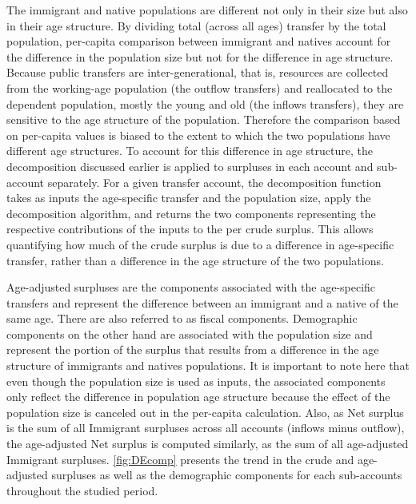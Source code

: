 The immigrant and native populations are different not only in their size but also in their age structure.
By dividing total (across all ages) transfer by the total population, per-capita comparison between immigrant and natives account for the difference in the population size but not for the difference in age structure.
Because public transfers are inter-generational, that is, resources are collected from the working-age population (the outflow transfers) and reallocated to the dependent population, mostly the young and old (the inflows transfers), they are sensitive to the age structure of the population.
Therefore the comparison based on per-capita values is biased to the extent to which the two populations have different age structures.
To account for this difference in age structure, the decomposition discussed earlier is applied to surpluses in each account and sub-account separately.
For a given transfer account, the decomposition function takes as inputs the age-specific transfer and the population size, apply the decomposition algorithm, and returns the two components representing the respective contributions of the inputs to the per crude surplus.
This allows quantifying how much of the crude surplus is due to a difference in age-specific transfer, rather than a  difference in the age structure of the two populations.

\vspace{0.7em}\par
Age-adjusted surpluses are the components associated with the age-specific transfers and represent the difference between an immigrant and a native of the same age.
There are also referred to as fiscal components.
Demographic components on the other hand are associated with the population size and represent the portion of the surplus that results from a difference in the age structure of immigrants and natives populations.
It is important to note here that even though the population size is used as inputs, the associated components only reflect the difference in population age structure because the effect of the population size is canceled out in the per-capita calculation.
Also, as Net surplus is the sum of all Immigrant surpluses across all accounts (inflows minus outflow), the age-adjusted Net surplus is computed similarly, as the sum of all age-adjusted Immigrant surpluses. \autoref{fig:DEcomp} presents the trend in the crude and age-adjusted surpluses as well as the demographic components for each sub-accounts throughout the studied period.

